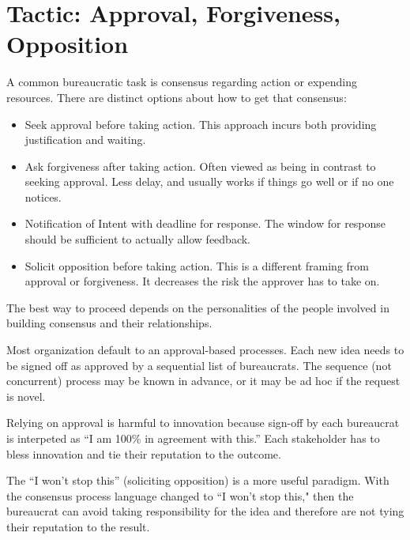 \section{Tactic: Approval, Forgiveness, Opposition\label{sec:approval-forgiveness-opposition}}

A common bureaucratic task is consensus regarding action or expending resources. There are distinct options about how to get that consensus:
\begin{itemize}
    \item Seek approval before taking action. This approach incurs both providing justification and waiting.
    \item Ask forgiveness after taking action. Often viewed as being in contrast to seeking approval. Less delay, and usually works if things go well or if no one notices. 
    \item Notification of Intent with deadline for response. The window for response should be sufficient to actually allow feedback. 
    \item Solicit opposition before taking action. This is a different framing from approval or forgiveness. It decreases the risk the approver has to take on.
\end{itemize}
The best way to proceed depends on the personalities of the people involved in building consensus and their relationships. 

Most organization default to an approval-based  processes. Each new idea needs to be signed off as approved by a sequential list of bureaucrats. The sequence (not concurrent) process may be known in advance, or it may be ad hoc if the request is novel.

Relying on approval is harmful to innovation because sign-off by each bureaucrat is interpeted as ``I am 100\% in agreement with this.'' Each stakeholder has to bless innovation and tie their reputation to the outcome.

The ``I won't stop this'' (soliciting opposition) is a more useful paradigm. With the consensus process language changed to ``I won't stop this," then the bureaucrat can avoid taking responsibility for the idea and therefore are not tying their reputation to the result.

